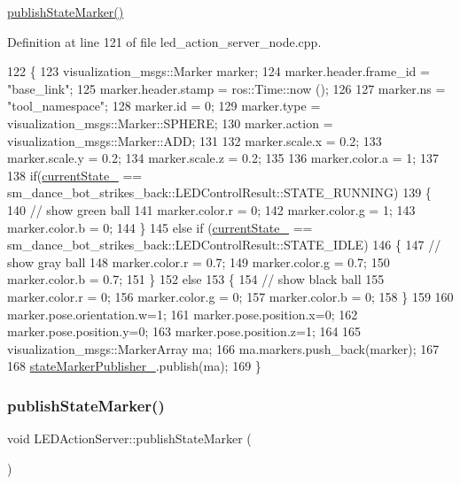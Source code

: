 \hyperlink{classLEDActionServer_a73bb754ac2347c50660624ad92315895}{publish\+State\+Marker()} 

Definition at line 121 of file led\+\_\+action\+\_\+server\+\_\+node.\+cpp.


\begin{DoxyCode}
122 \{
123     visualization\_msgs::Marker marker;
124     marker.header.frame\_id = \textcolor{stringliteral}{"base\_link"};
125     marker.header.stamp = ros::Time::now ();
126 
127     marker.ns = \textcolor{stringliteral}{"tool\_namespace"};
128     marker.id = 0;
129     marker.type = visualization\_msgs::Marker::SPHERE;
130     marker.action = visualization\_msgs::Marker::ADD;
131     
132     marker.scale.x = 0.2;
133     marker.scale.y = 0.2;
134     marker.scale.z = 0.2;
135 
136     marker.color.a = 1;
137 
138     \textcolor{keywordflow}{if}(\hyperlink{classLEDActionServer_a1dc456e987dc331501ad6ff2215661ff}{currentState\_} == sm\_dance\_bot\_strikes\_back::LEDControlResult::STATE\_RUNNING)
139     \{
140       \textcolor{comment}{// show green ball}
141       marker.color.r = 0;
142       marker.color.g = 1;
143       marker.color.b = 0;
144     \}
145     \textcolor{keywordflow}{else} \textcolor{keywordflow}{if} (\hyperlink{classLEDActionServer_a1dc456e987dc331501ad6ff2215661ff}{currentState\_} == sm\_dance\_bot\_strikes\_back::LEDControlResult::STATE\_IDLE)
146     \{
147       \textcolor{comment}{// show gray ball}
148       marker.color.r = 0.7;
149       marker.color.g = 0.7;
150       marker.color.b = 0.7;
151     \}
152     \textcolor{keywordflow}{else}
153     \{
154       \textcolor{comment}{// show black ball}
155       marker.color.r = 0;
156       marker.color.g = 0;
157       marker.color.b = 0;
158     \}
159 
160     marker.pose.orientation.w=1;
161     marker.pose.position.x=0;
162     marker.pose.position.y=0;
163     marker.pose.position.z=1;
164 
165     visualization\_msgs::MarkerArray ma;
166     ma.markers.push\_back(marker);
167 
168     \hyperlink{classLEDActionServer_a4168a1e4a17eb1d65aaa059ce0c52086}{stateMarkerPublisher\_}.publish(ma);
169 \}
\end{DoxyCode}
\mbox{\label{classLEDActionServer_a73bb754ac2347c50660624ad92315895}} 
\subsubsection{\texorpdfstring{publish\+State\+Marker()}{publishStateMarker()}\hspace{0.1cm}{\footnotesize\ttfamily [2/5]}}
{\footnotesize\ttfamily void L\+E\+D\+Action\+Server\+::publish\+State\+Marker (\begin{DoxyParamCaption}{ }\end{DoxyParamCaption})\hspace{0.3cm}{\ttfamily [inline]}}

